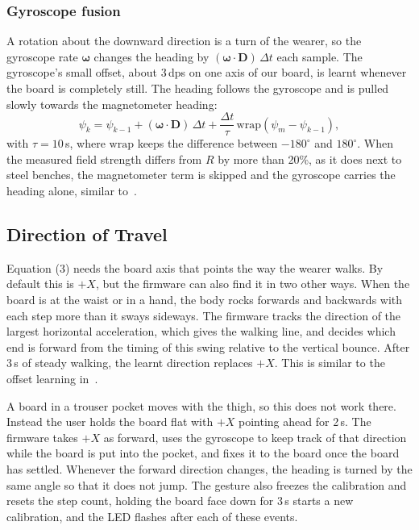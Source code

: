 \documentclass[conference,a4paper]{IEEEtran}
\begin{document}
\subsubsection{Gyroscope fusion}
A rotation about the downward direction is a turn of the wearer, so the gyroscope rate
$\boldsymbol{\omega}$ changes the heading by $(\boldsymbol{\omega}\cdot\mathbf{D})\,\Delta t$
each sample. The gyroscope's small offset, about 3\,dps on one axis of our board, is learnt
whenever the board is completely still. The heading follows the gyroscope and is pulled slowly
towards the magnetometer heading:
\begin{equation}
\psi_k=\psi_{k-1}+(\boldsymbol{\omega}\cdot\mathbf{D})\,\Delta t
      +\frac{\Delta t}{\tau}\,\mathrm{wrap}(\psi_m-\psi_{k-1}),
\end{equation}
with $\tau=10$\,s, where $\mathrm{wrap}$ keeps the difference between $-180^\circ$ and
$180^\circ$. When the measured field strength differs from $R$ by more than 20\%, as it does
next to steel benches, the magnetometer term is skipped and the gyroscope carries the heading
alone, similar to~\cite{kuang2018}.

\subsection{Direction of Travel}
Equation (3) needs the board axis that points the way the wearer walks. By default this is
$+X$, but the firmware can also find it in two other ways. When the board is at the waist or in a hand, the body rocks forwards and backwards with each
step more than it sways sideways. The firmware tracks the direction of the largest horizontal
acceleration, which gives the walking line, and decides which end is forward from the timing of
this swing relative to the vertical bounce. After 3\,s of steady walking, the learnt direction
replaces $+X$. This is similar to the offset learning in~\cite{tian2016}.

A board in a trouser pocket moves with the thigh, so this does not work there. Instead the user
holds the board flat with $+X$ pointing ahead for 2\,s. The firmware takes $+X$ as forward, uses
the gyroscope to keep track of that direction while the board is put into the pocket, and fixes
it to the board once the board has settled. Whenever the forward direction changes, the heading
is turned by the same angle so that it does not jump. The gesture also freezes the calibration
and resets the step count, holding the board face down for 3\,s starts a new calibration, and
the LED flashes after each of these events.
\end{document}
